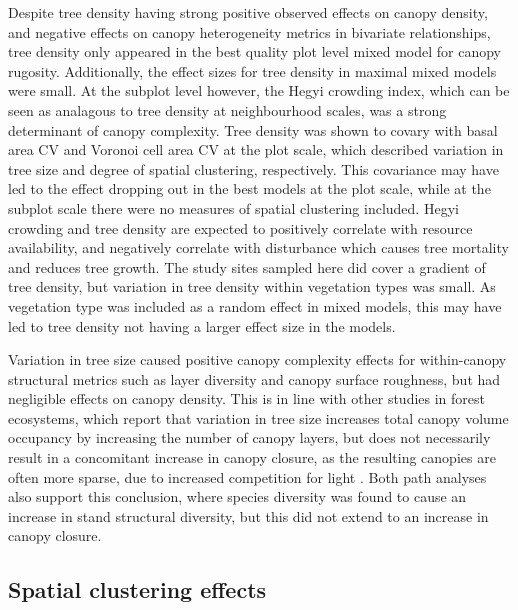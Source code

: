 \documentclass[11pt,a4paper]{article}
\begin{document}
Despite tree density having strong positive observed effects on canopy density, and negative effects on canopy heterogeneity metrics in bivariate relationships, tree density only appeared in the best quality plot level mixed model for canopy rugosity. Additionally, the effect sizes for tree density in maximal mixed models were small. At the subplot level however, the Hegyi crowding index, which can be seen as analagous to tree density at neighbourhood scales, was a strong determinant of canopy complexity. Tree density was shown to covary with basal area CV and Voronoi cell area CV at the plot scale, which described variation in tree size and degree of spatial clustering, respectively. This covariance may have led to the effect dropping out in the best models at the plot scale, while at the subplot scale there were no measures of spatial clustering included. Hegyi crowding and tree density are expected to positively correlate with resource availability, and negatively correlate with disturbance which causes tree mortality and reduces tree growth. The study sites sampled here did cover a gradient of tree density, but variation in tree density within vegetation types was small. As vegetation type was included as a random effect in mixed models, this may have led to tree density not having a larger effect size in the models.

Variation in tree size caused positive canopy complexity effects for within-canopy structural metrics such as layer diversity and canopy surface roughness, but had negligible effects on canopy density. This is in line with other studies in forest ecosystems, which report that variation in tree size increases total canopy volume occupancy by increasing the number of canopy layers, but does not necessarily result in a concomitant increase in canopy closure, as the resulting canopies are often more sparse, due to increased competition for light \citep{Beland2021a}. Both path analyses also support this conclusion, where species diversity was found to cause an increase in stand structural diversity, but this did not extend to an increase in canopy closure. 

\subsection{Spatial clustering effects}
\end{document}
